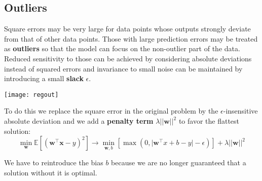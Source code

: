 \subsection{Outliers}
Square errors may be very large for data points whose outputs strongly deviate from that of other data points. Those with large prediction errors may be treated as \textbf{outliers} so that the model can focus on the non-outlier part of the data. Reduced sensitivity to those can be achieved by considering absolute deviations instead of squared errors and invariance to small noise can be maintained by introducing a small \textbf{slack} $\epsilon$.
\begin{center}
	\texttt{[image: regout]}
\end{center}
To do this we replace the square error in the original problem by the $\epsilon$-insensitive absolute deviation and we add a \textbf{penalty term} $\lambda\lvert\lvert \mathbf{w}\rvert\rvert^2$ to favor the flattest solution:
\begin{equation*}
	\min_\mathbf{w} \mathbb{E}[(\mathbf{w}^\top \mathbf{x}-y)^2] \longrightarrow \min_{\mathbf{w},b}[\max(0,\lvert \mathbf{w}^\top x + b -y \rvert -\epsilon)] + \lambda\lvert\lvert \mathbf{w}\rvert\rvert^2
\end{equation*}
\begin{note}
	We have to reintroduce the bias $b$ because we are no longer guaranteed that a solution without it is optimal.
\end{note}


